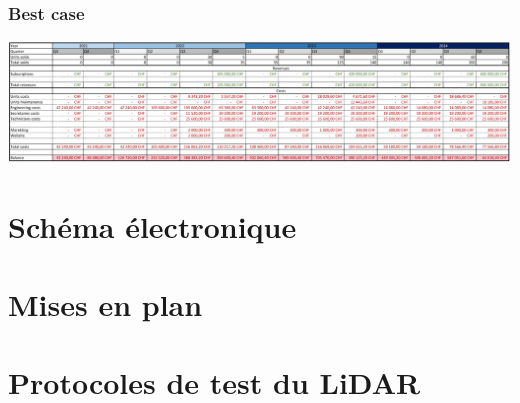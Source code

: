 \documentclass[11pt,titlepage]{report}
\begin{document}
\subsection{Best case}
\includegraphics[angle=90, height=\textheight]{Images/business/best.png}

\chapter{Schéma électronique}


\chapter{Mises en plan}


\chapter{Protocoles de test du LiDAR}
\label{app:testLiDAR}


\setlength{\topmargin}{-2.2mm} %
\printbibliography[heading=bibintoc]
\end{document}
